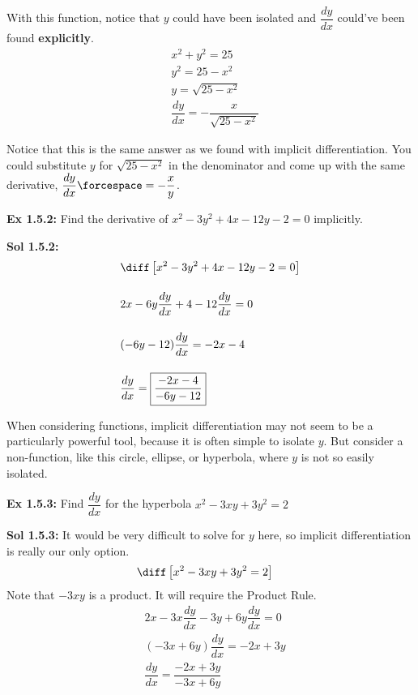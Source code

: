 With this function, notice that $y$ could have been isolated and $\dfrac{dy}{dx}$ could've been found \textbf{explicitly}. \begin{align*}
    & x^2 + y^2 = 25 \\[11pt]
    & y^2 = 25 - x^2 \\[11pt]
    & y = \sqrt{25 - x^2} \\[11pt]
    & \dfrac{dy}{dx} = -\dfrac{x}{\sqrt{25 - x^2}}
\end{align*}

Notice that this is the same answer as we found with implicit differentiation. You could substitute $y$ for $\sqrt{25 - x^2}$ in the denominator and come up with the same derivative, $\dfrac{dy}{dx} \forcespace= -\dfrac{x}{y}$. \par

\begin{tcolorbox}[example]
    \textbf{Ex 1.5.2: } Find the derivative of $x^2 - 3y^2 + 4x - 12y - 2 = 0$ implicitly.
\end{tcolorbox}
\begin{tcolorbox}[solution]
    \textbf{Sol 1.5.2: } \begin{align*}
        & \diff \left[x^2 - 3y^2 + 4x - 12y - 2 = 0\right] \\[11pt]
        & 2x - 6y\dfrac{dy}{dx} + 4 - 12\dfrac{dy}{dx} = 0 \\[11pt]
        &(-6y - 12)\dfrac{dy}{dx} = -2x - 4 \\[11pt]
        &\dfrac{dy}{dx} = \boxed{\dfrac{-2x - 4}{-6y - 12}}
    \end{align*}
\end{tcolorbox}

When considering functions, implicit differentiation may not seem to be a particularly powerful tool, because it is often simple to isolate $y$. But consider a non-function, like this circle, ellipse, or hyperbola, where $y$ is not so easily isolated. \par

\begin{tcolorbox}[example]
    \textbf{Ex 1.5.3: } Find $\dfrac{dy}{dx}$ for the hyperbola $x^2 - 3xy + 3y^2 = 2$
\end{tcolorbox}
\begin{tcolorbox}[solution]
    \textbf{Sol 1.5.3: } It would be very difficult to solve for $y$ here, so implicit differentiation is
    really our only option. \begin{align*}
        & \diff \left[x^2 - 3xy + 3y^2 = 2\right] 
    \end{align*}
    Note that $-3xy$ is a product. It will require the Product Rule. \begin{align*}
        & 2x - 3x\dfrac{dy}{dx} - 3y + 6y\dfrac{dy}{dx} = 0 \\
        & (-3x + 6y)\dfrac{dy}{dx} = -2x + 3y \\
        & \dfrac{dy}{dx} = \boxed{\dfrac{-2x + 3y}{-3x + 6y}}
    \end{align*}
\end{tcolorbox} \vspace{11pt}

